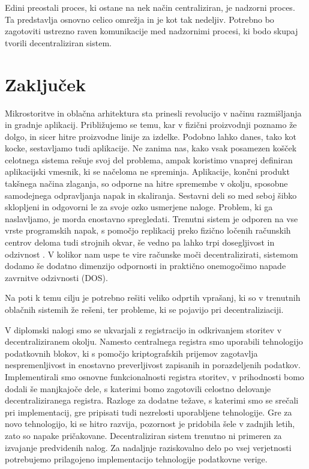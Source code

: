 \documentclass[a4paper, 12pt]{book}
\begin{document}
Edini preostali proces, ki ostane na nek način centraliziran, je nadzorni proces.
Ta predstavlja osnovno celico omrežja in je kot tak nedeljiv.
Potrebno bo zagotoviti ustrezno raven komunikacije med nadzornimi procesi, ki bodo skupaj tvorili decentraliziran sistem.


\chapter{Zaključek}
\label{stroka}

Mikrostoritve in oblačna arhitektura sta prinesli revolucijo v načinu ra\-zmišlja\-nja in gradnje aplikacij.
Približujemo se temu, kar v fizični proizvodnji poznamo že dolgo, in sicer hitre proizvodne linije za izdelke.
Podobno lahko danes, tako kot kocke, sestavljamo tudi aplikacije.
Ne zanima nas, kako vsak posamezen košček celotnega sistema rešuje svoj del problema, ampak koristimo vnaprej definiran aplikacijski vmesnik, ki se načeloma ne spreminja.
Aplikacije, končni produkt takšnega načina zlaganja, so odporne na hitre spremembe v okolju, sposobne samodejnega odpravljanja napak in skaliranja.
Sestavni deli so med seboj šibko sklopljeni in odgovorni le za svoje ozko usmerjene naloge.
Problem, ki ga naslavljamo, je morda enostavno spregledati.
Trenutni sistem je odporen na vse vrste programskih napak, s pomočjo replikacij preko fizično ločenih računskih centrov deloma tudi strojnih okvar, še vedno pa lahko trpi dosegljivost in odzivnost \cite{awsFail}.
V kolikor nam uspe te vire računske moči decentralizirati, sistemom dodamo še dodatno dimenzijo odpornosti in praktično onemogočimo napade zavrnitve odzivnosti (DOS).

Na poti k temu cilju je potrebno rešiti veliko odprtih vprašanj, ki so v trenutnih oblačnih sistemih že rešeni, ter probleme, ki se pojavijo pri decentraliziaciji.

V diplomski nalogi smo se ukvarjali z registracijo in odkrivanjem storitev v decentraliziranem okolju.
Namesto centralnega registra smo uporabili tehnologijo podatkovnih blokov, ki s pomočjo kriptografskih prijemov zagotavlja nespremenljivost in enostavno preverljivost zapisanih in porazdeljenih podatkov.
Implementirali smo osnovne funkcionalnosti registra storitev, v prihodnosti bomo dodali še manjkajoče dele, s katerimi bomo zagotovili celostno delovanje decentraliziranega registra.
Razloge za dodatne težave, s katerimi smo se srečali pri implementacij, gre pripisati tudi nezrelosti uporabljene tehnologije.
Gre za novo tehnologijo, ki se hitro razvija, pozornost je pridobila šele v zadnjih letih, zato so napake pričakovane.
Decentraliziran sistem trenutno ni primeren za izvajanje predvidenih nalog.
Za nadaljnje raziskovalno delo po vsej verjetnosti potrebujemo prilagojeno implementacijo tehnologije podatkovne verige.
\end{document}
